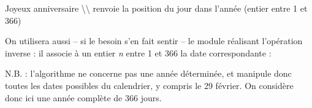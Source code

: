 \begin{Exercice}{Joyeux anniversaire}
	{\sffamily
	{\textbackslash}{\textbackslash} renvoie la position du jour dans
	l’année (entier entre 1 et 366)}

	On utilisera aussi – si le besoin s’en fait sentir – le module réalisant
	l’opération inverse : il associe à un entier \textit{n} entre 1 et 366
	la date correspondante :
	

	N.B. : l’algorithme ne concerne pas une année déterminée, et manipule
	donc toutes les dates possibles du calendrier, y compris le 29 février.
	On considère donc ici une année complète de 366 jours.
\end{Exercice}

